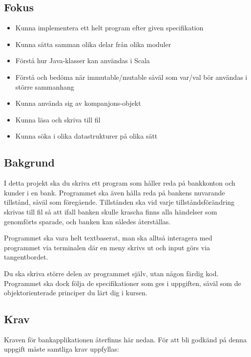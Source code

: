 

\subsection{Fokus}
\begin{itemize}[nosep,label={$\square$},leftmargin=*]
\item Kunna implementera ett helt program efter given specifikation
\item Kunna sätta samman olika delar från olika moduler
\item Förstå hur Java-klasser kan användas i Scala
\item Förstå och bedöma när immutable/mutable såväl som var/val bör användas i större sammanhang
\item Kunna använda sig av kompanjons-objekt
\item Kunna läsa och skriva till fil
\item Kunna söka i olika datastrukturer på olika sätt
\end{itemize}

\subsection{Bakgrund}

I detta projekt ska du skriva ett program som håller reda på bankkonton och kunder i en bank. Programmet ska även hålla reda på bankens nuvarande tillstånd, såväl som föregående.
Tillstånden ska vid varje tillståndsförändring skrivas till fil så att ifall banken skulle krascha finns alla händelser som genomförts sparade, och banken kan således återställas.

Programmet ska vara helt textbaserat, man ska alltså interagera med programmet via terminalen där en meny skrivs ut och input görs via tangentbordet.

Du ska skriva större delen av programmet själv, utan någon färdig kod. Programmet ska dock följa de specifikationer som ges i uppgiften, såväl som de objektorienterade principer du lärt dig i kursen.

\subsection{Krav}

Kraven för bankapplikationen återfinns här nedan. För att bli godkänd på denna uppgift måste samtliga krav uppfyllas:


